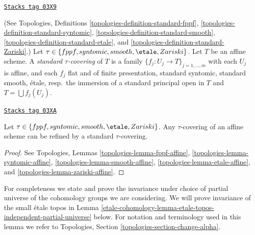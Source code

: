 \begin{definition}
\label{etale-cohomology-definition-standard-tau}
\href{https://stacks.math.columbia.edu/tag/03X9}{\texttt{Stacks tag 03X9}}

(See
Topologies, Definitions
\ref{topologies-definition-standard-fppf},
\ref{topologies-definition-standard-syntomic},
\ref{topologies-definition-standard-smooth},
\ref{topologies-definition-standard-etale}, and
\ref{topologies-definition-standard-Zariski}.)
Let $\tau \in \{fppf, syntomic, smooth, \etale, Zariski\}$.
Let $T$ be an affine scheme.
A {\it standard $\tau$-covering} of $T$ is a family
$\{f_j : U_j \to T\}_{j = 1, \ldots, m}$ with each $U_j$ is affine,
and each $f_j$ flat and of finite presentation,
standard syntomic, standard smooth, \'etale, resp.\ the immersion of a
standard principal open in $T$ and $T = \bigcup f_j(U_j)$.
\end{definition}

\begin{lemma}
\label{etale-cohomology-lemma-tau-affine}
\href{https://stacks.math.columbia.edu/tag/03XA}{\texttt{Stacks tag 03XA}}

Let $\tau \in \{fppf, syntomic, smooth, \etale, Zariski\}$.
Any $\tau$-covering of an affine scheme can be refined by a
standard $\tau$-covering.
\end{lemma}

\begin{proof}
See
Topologies, Lemmas
\ref{topologies-lemma-fppf-affine},
\ref{topologies-lemma-syntomic-affine},
\ref{topologies-lemma-smooth-affine},
\ref{topologies-lemma-etale-affine}, and
\ref{topologies-lemma-zariski-affine}.
\end{proof}

For completeness we state and prove the invariance under choice of partial
universe of the cohomology groups we are considering. We will prove invariance
of the small \'etale topos in
Lemma \ref{etale-cohomology-lemma-etale-topos-independent-partial-universe} below.
For notation and terminology used in this lemma we refer to
Topologies, Section \ref{topologies-section-change-alpha}.

